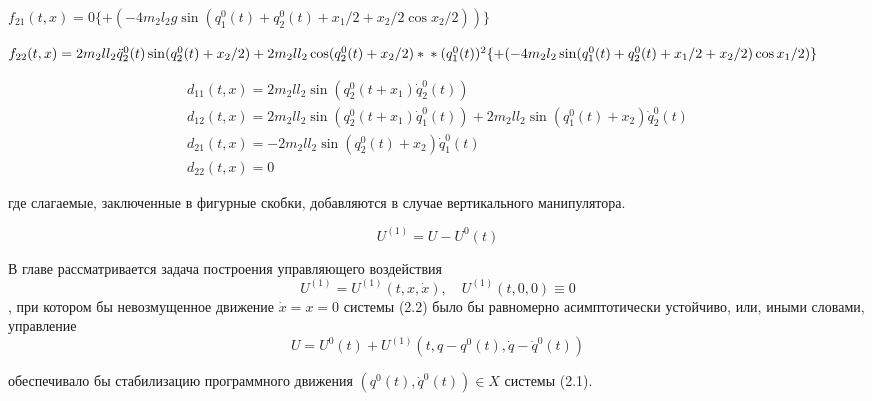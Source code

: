 $f_{21}(t,x) = 0 \{ + (-4 m_2 l_2 g \sin (q_1^0 (t) + q_2^0 (t) + x_1 /2 + x_2 / 2 \cos x_2 / 2)) \}$

$f_{22}(t,x) = 2 m_2 l l_2 \ddot q_2^0 (t) \sin (q_2^0 (t) + x_2 / 2) + 2 m_2 l l_2 \cos (q_2^0 (t) + x_2 /2) * \\ 
* (q_1^0 (t))^2 \{ + (-4 m_2 l_2 \sin (q_1^0 (t) + q_2^0 (t) + x_1 / 2 + x_2 /2) \cos x_1 /2) \}$

$$
\begin{array}{l}
d_{11}(t, x) = 2 m_2 l l_2 \sin(q_2^0 (t + x_1) \dot q_2^0 (t)) \\
d_{12}(t, x) = 2 m_2 l l_2 \sin(q_2^0 (t + x_1) \dot q_1^0 (t)) + 2 m_2 l l_2 \sin(q_1^0 (t) + x_2) \dot q_2^0 (t) \\
d_{21}(t, x) = - 2 m_2 l l_2 \sin (q_2^0 (t) + x_2) \dot q_1^0 (t) \\
d_{22}(t, x) = 0
\end{array}
$$

где слагаемые, заключенные в фигурные скобки, добавляются в случае вертикального манипулятора.

$$ U^{(1)} = U - U^{0}(t) $$

В главе рассматривается задача построения управляющего воздействия $$ U^{(1)} = U^{(1)}(t, x, \dot x), \quad U^{(1)} (t, 0, 0) \equiv 0 $$, при котором бы невозмущенное движение $\dot x = x = 0$  системы (2.2) было бы равномерно асимптотически устойчиво, или, иными словами, управление $$U = U^0(t) + U^{(1)}(t, q-q^0(t), \dot q - \dot q^0(t))$$

обеспечивало бы стабилизацию программного движения $(q^0(t), \dot q^0(t)) \in X$  системы (2.1).